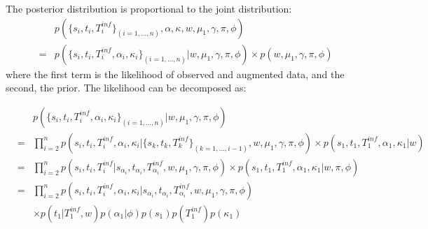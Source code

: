 \documentclass[10pt]{article}
\begin{document}
The posterior distribution is proportional to the joint distribution:
\begin{eqnarray}
& & p(\{s_i, t_i, T_i^{inf}\}_{(i=1,\ldots,n)}, \alpha, \kappa, w, \mu_1, \gamma, \pi, \phi)\\
& = & p(\{s_i, t_i, T_i^{inf}, \alpha_i, \kappa_i\}_{(i=1,\ldots,n)}| w, \mu_1, \gamma, \pi, \phi) \times p( w, \mu_1, \gamma, \pi, \phi)
\end{eqnarray}
where the first term is the likelihood of observed and augmented data, and the second, the prior.
The likelihood can be decomposed as:

\begin{eqnarray}
& & p(\{s_i, t_i, T_i^{inf}, \alpha_i, \kappa_i\}_{(i=1,\ldots,n)}|  w, \mu_1, \gamma, \pi, \phi) \\
& = & \prod_{i=2}^n p(s_i, t_i, T_i^{inf}, \alpha_i, \kappa_i | \{s_k, t_k, T_k^{inf} \}_{(k=1,\ldots,i-1)}, w, \mu_1, \gamma, \pi, \phi) 
  \times p(s_1, t_1, T_1^{inf}, \alpha_1, \kappa_1 |w)\\
& = & \prod_{i=2}^n p(s_i, t_i, T_i^{inf}| s_{\alpha_i}, t_{\alpha_i}, T_{\alpha_i}^{inf},  w, \mu_1, \gamma, \pi, \phi) 
  \times p(s_1, t_1 , T_1^{inf}, \alpha_1, \kappa_1 |w, \pi, \phi)\\
& = & \prod_{i=2}^n p(s_i, t_i, T_i^{inf}, \alpha_i, \kappa_i | s_{\alpha_i}, t_{\alpha_i}, T_{\alpha_i}^{inf},  w, \mu_1, \gamma, \pi, \phi)\\ 
 & & \times p(t_1 | T_1^{inf},w) p(\alpha_1 | \phi) p(s_1) p(T_1^{inf}) p(\kappa_1) 
\end{eqnarray}
\end{document}
